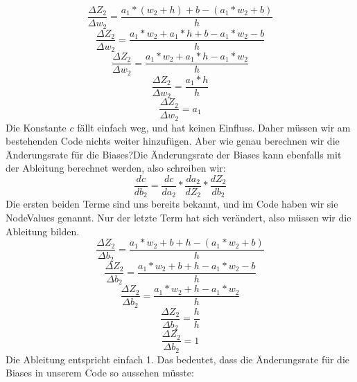 \documentclass[12pt]{article}
\begin{document}
$$\frac{\Delta Z_2 }{\Delta w_2 } = \frac{ a_1 * (w_2+h) + b -(a_1 * w_2 + b) }{ h }$$
$$\frac{\Delta Z_2 }{\Delta w_2 } = \frac{ a_1*w_2+a_1*h + b -a_1 * w_2 - b }{ h }$$
$$\frac{\Delta Z_2 }{\Delta w_2 } = \frac{ a_1*w_2+a_1*h-a_1 * w_2 }{ h }$$
$$\frac{\Delta Z_2 }{\Delta w_2 } = \frac{a_1*h }{ h }$$
$$\frac{\Delta Z_2 }{\Delta w_2 } = a_1$$
Die Konstante $c$ fällt einfach weg, und hat keinen Einfluss. Daher müssen wir am bestehenden Code nichts weiter hinzufügen. Aber wie genau berechnen wir die Änderungsrate für die Biases?Die Änderungsrate der Biases kann ebenfalls mit der Ableitung berechnet werden, also schreiben wir:
$$\frac{ dc }{ db_{ 2 } }=
\frac{ dc }{ da_{ 2 } }*
\frac{ da_{ 2 } }{ dZ_{ 2 } }*
\frac{ dZ_{ 2 } }{ db_{ 2 } }$$
Die ersten beiden Terme sind uns bereits bekannt, und im Code haben wir sie NodeValues genannt. Nur der letzte Term hat sich verändert, also müssen wir die Ableitung bilden.
$$\frac{\Delta Z_2 }{\Delta b_2 } = \frac{ a_1 * w_2 + b+h -(a_1 * w_2 + b) }{ h }$$
$$\frac{\Delta Z_2 }{\Delta b_2 } = \frac{ a_1 * w_2 + b+h -a_1 * w_2 - b }{ h }$$
$$\frac{\Delta Z_2 }{\Delta b_2 } = \frac{ a_1 * w_2 +h -a_1 * w_2 }{ h }$$
$$\frac{\Delta Z_2 }{\Delta b_2 } = \frac{ h  }{ h }$$
$$\frac{\Delta Z_2 }{\Delta b_2 } = 1$$
Die Ableitung entspricht einfach 1. Das bedeutet, dass die Änderungsrate für die Biases in unserem Code so aussehen müsste:
\end{document}
